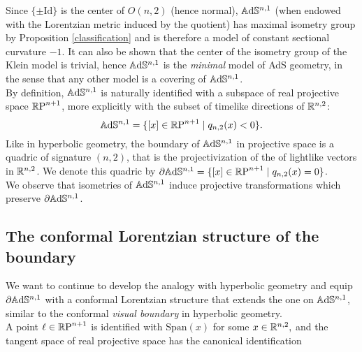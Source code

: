 Since $\{\pm \text{Id}\}$ is the center of $O(n,2)$ (hence normal), $\mathbb{A}\mathrm{d}\mathbb{S}^{n,1}$ (when endowed with the Lorentzian metric induced by the quotient) has maximal isometry group by Proposition \ref{classification} and is therefore a model of constant sectional curvature $-1$. It can also be shown that the center of the isometry group of the Klein model is trivial, hence $\mathbb{A}\mathrm{d}\mathbb{S}^{n,1}$ is the \textit{minimal} model of AdS geometry, in the sense that any other model is a covering of $\mathbb{A}\mathrm{d}\mathbb{S}^{n,1}$.\\
By definition, $\mathbb{A}\mathrm{d}\mathbb{S}^{n,1}$ is naturally identified with a subspace of real projective space $\mathbb{R} \text{P}^{n+1}$, more explicitly with the subset of timelike directions of $\mathbb{R}^{n,2}$: 
\[
    \mathbb{A}\mathrm{d}\mathbb{S}^{n,1}=\{[x]\in \mathbb{R} \text{P}^{n+1}\;|\;q_{n,2}(x)<0\}.
\]
Like in hyperbolic geometry, the boundary of $\mathbb{A}\mathrm{d}\mathbb{S}^{n,1}$ in projective space is a quadric of signature $(n,2)$, that is the projectivization of the of lightlike vectors in $\mathbb{R}^{n,2}$. We denote this quadric by $\partial \mathbb{A}\mathrm{d}\mathbb{S}^{n,1}=\{[x]\in \mathbb{R} \text{P}^{n+1}\;|\;q_{n,2}(x)=0\}$.\\ We observe that isometries of $\mathbb{A}\mathrm{d}\mathbb{S}^{n,1}$ induce projective transformations which preserve $\partial \mathbb{A}\mathrm{d}\mathbb{S}^{n,1}$.  \\

\subsection{The conformal Lorentzian structure of the boundary}
We want to continue to develop the analogy with hyperbolic geometry and equip $\partial \mathbb{A}\mathrm{d}\mathbb{S}^{n,1}$ with a conformal Lorentzian structure that extends the one on $\mathbb{A}\mathrm{d}\mathbb{S}^{n,1}$, similar to the conformal \textit{visual boundary} in hyperbolic geometry. \\
A point $\ell \in\mathbb{R}\text{P}^{n+1}$ is identified with $\text{Span}(x)$ for some $x\in \mathbb{R}^{n,2},$ and the tangent space of real projective space has the canonical identification 


